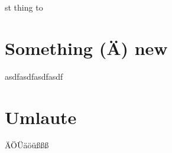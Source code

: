 \documentclass{article}
\begin{document}
st thing to
\section{Something (\"A) new}
asdfasdfasdfasdf

\section{Umlaute}
ÄÖÜäöüßßß
\end{document}
